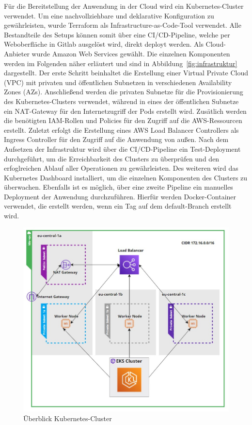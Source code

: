 \documentclass[a4paper, 10pt, conference]{IEEEtran}
\begin{document}
Für die Bereitstellung der Anwendung in der Cloud wird ein Kubernetes-Cluster\cite{kubernetes} verwendet. 
Um eine nachvollziehbare und deklarative Konfiguration zu gewährleisten, wurde Terraform\cite{terraform} als Infrastructure-as-Code-Tool verwendet. 
Alle Bestandteile des Setups können somit über eine CI/CD-Pipeline, welche per Weboberfläche in Gitlab ausgelöst wird, direkt deployt werden.
Als Cloud-Anbieter wurde Amazon Web Services gewählt. Die einzelnen Komponenten werden im Folgenden näher erläutert und sind in Abbildung~\ref{fig:infrastruktur} dargestellt.
Der erste Schritt beinhaltet die Erstellung einer Virtual Private Cloud (VPC) mit privaten und öffentlichen Subnetzen in verschiedenen Availability Zones (AZs).
Anschließend werden die privaten Subnetze für die Provisionierung des Kubernetes-Clusters verwendet, während in eines der öffentlichen Subnetze ein NAT-Gateway für den Internetzugriff der Pods erstellt wird.
Zusätlich werden die benötigten IAM-Rollen und Policies für den Zugriff auf die AWS-Ressourcen erstellt.
Zuletzt erfolgt die Erstellung eines AWS Load Balancer Controllers als Ingress Controller für den Zugriff auf die Anwendung von außen.
Nach dem Aufsetzen der Infrastruktur wird über die CI/CD-Pipeline ein Test-Deployment durchgeführt, um die Erreichbarkeit des Clusters zu überprüfen und den erfoglreichen Ablauf aller Operationen zu gewährleisten.
Des weiteren wird das Kubernetes Dashboard installiert, um die einzelnen Komponenten des Clusters zu überwachen.
Ebenfalls ist es möglich, über eine zweite Pipeline ein manuelles Deployment der Anwendung durchzuführen.
Hierfür werden Docker-Container verwendet, die erstellt werden, wenn ein Tag auf dem default-Branch erstellt wird.

\begin{figure}[thp]
    \centering
    \includegraphics[width=\linewidth]{k8s}
    \caption{Überblick Kubernetes-Cluster}
    \label{fig:infra}
\end{figure}
\end{document}
